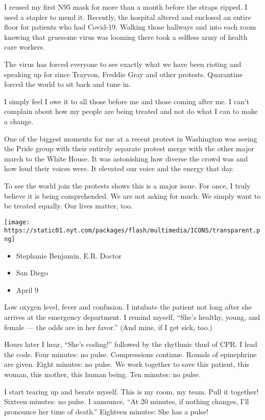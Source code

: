 I reused my first N95 mask for more than a month before the straps
ripped. I used a stapler to mend it. Recently, the hospital altered and
enclosed an entire floor for patients who had Covid-19. Walking those
hallways and into each room knowing that gruesome virus was looming
there took a selfless army of health care workers.

The virus has forced everyone to see exactly what we have been rioting
and speaking up for since Trayvon, Freddie Gray and other protests.
Quarantine forced the world to sit back and tune in.

I simply feel I owe it to all those before me and those coming after me.
I can't complain about how my people are being treated and not do what I
can to make a change.

One of the biggest moments for me at a recent protest in Washington was
seeing the Pride group with their entirely separate protest merge with
the other major march to the White House. It was astonishing how diverse
the crowd was and how loud their voices were. It elevated our voice and
the energy that day.

To see the world join the protests shows this is a major issue. For
once, I truly believe it is being comprehended. We are not asking for
much. We simply want to be treated equally. Our lives matter, too.

\texttt{[image: https://static01.nyt.com/packages/flash/multimedia/ICONS/transparent.png]}

\begin{itemize}
\tightlist
\item
  Stephanie Benjamin, E.R. Doctor
\item
  San Diego
\item
  April 9
\end{itemize}

Low oxygen level, fever and confusion. I intubate the patient not long
after she arrives at the emergency department. I remind myself, ``She's
healthy, young, and female --- the odds are in her favor.'' (And mine,
if I get sick, too.)

Hours later I hear, ``She's coding!'' followed by the rhythmic thud of
CPR. I lead the code. Four minutes: no pulse. Compressions continue.
Rounds of epinephrine are given. Eight minutes: no pulse. We work
together to save this patient, this woman, this mother, this human
being. Ten minutes: no pulse.

I start tearing up and berate myself. This is my room, my team. Pull it
together! Sixteen minutes: no pulse. I announce, ``At 20 minutes, if
nothing changes, I'll pronounce her time of death.'' Eighteen minutes:
She has a pulse!

